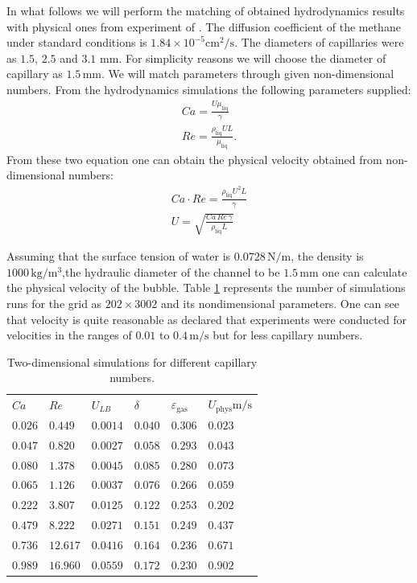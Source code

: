 \documentclass{article}
\begin{document}
In what follows we will perform the matching of obtained hydrodynamics results
\cite{kuzmin-binary2d} with physical ones from experiment of \citet{bercic-mass}. The diffusion
coefficient of the methane under standard conditions \cite{methane-properties} is
$1.84\times 10^{-5} \mathrm{cm}^2/\mathrm{s}$. The diameters of capillaries were as $1.5$, $2.5$ and
$3.1$ $\mathrm{mm}$. For simplicity reasons we will choose the diameter of capillary as $1.5\,
\mathrm{mm}$. 
We will match parameters through given non-dimensional numbers. From the hydrodynamics
simulations the following parameters supplied:
\begin{equation}
\begin{aligned}
Ca=\frac{U \mu_{\mathrm{liq}}}{\gamma}\\
Re=\frac{\rho_{\mathrm{liq}} U L}{\mu_{\mathrm{liq}}}.
\end{aligned}
\end{equation}
From these two equation one can obtain the physical velocity obtained from non-dimensional numbers:
\begin{equation}
\begin{aligned}
Ca\cdot Re= \frac{\rho_{\mathrm{liq}} U^2 L}{\gamma}\\
U=\sqrt{\frac{Ca\,Re\,\gamma}{\rho_{\mathrm{liq}}L}}
\end{aligned}
\end{equation}

Assuming that the surface tension of water is $0.0728\,\mathrm{N/m}$, the density is
$1000\,\mathrm{kg/m^3}$,the hydraulic diameter of the channel to be $1.5\,\mathrm{mm}$ one can
calculate the physical velocity of the bubble.
Table \ref{table:twod:simulations} represents the number of simulations runs for the grid as
$202\times 3002$ and its nondimensional parameters. One can see that velocity is quite reasonable
as \citet{bercic-mass} declared that experiments were conducted for velocities in the ranges of
$0.01$ to $0.4\,\mathrm{m}/\mathrm{s}$ but for less capillary numbers. 
\begin{table}
\begin{tabularx}{\textwidth}{|X|X|X|X|X|X|}
$Ca$    &$Re$     &$U_{LB}$ &$\delta$&$\varepsilon_{\mathrm{gas}}$
&$U_{\mathrm{phys}}\mathrm{m/s}$\\
$0.026$ &$0.449$  &$0.0014$ &$0.040$ &$0.306$ &$0.023$   \\ 
$0.047$ &$0.820$  &$0.0027$ &$0.058$ &$0.293$ &$0.043$   \\ 
$0.080$ &$1.378$  &$0.0045$ &$0.085$ &$0.280$ &$0.073$ \\
$0.065$ &$1.126$  &$0.0037$ &$0.076$ &$0.266$ &$0.059$      \\
$0.222$ &$3.807$  &$0.0125$ &$0.122$ &$0.253$ &$0.202$  \\
$0.479$ &$8.222$  &$0.0271$ &$0.151$ &$0.249$ &$0.437$  \\
$0.736$ &$12.617$ &$0.0416$ &$0.164$ &$0.236$ &$0.671$  \\ 
$0.989$ &$16.960$ &$0.0559$ &$0.172$ &$0.230$ &$0.902$  \\
\end{tabularx}
\caption{Two-dimensional simulations for different
capillary numbers. \label{table:twod:simulations}}
\end{table}
\end{document}
